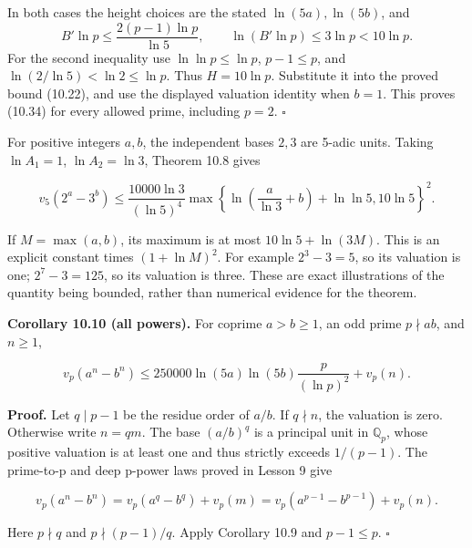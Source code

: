 \documentclass[
  11pt,
  a4paper,
]{article}
\begin{document}
In both cases the height choices are the stated \(\ln(5a),\ln(5b)\), and
\[
B'\ln p\le\frac{2(p-1)\ln p}{\ln5},
\qquad \ln(B'\ln p)\le3\ln p<10\ln p.
\] For the second inequality use \(\ln\ln p\le\ln p\), \(p-1\le p\), and
\(\ln(2/\ln5)<\ln2\le\ln p\). Thus \(H=10\ln p\). Substitute it into the
proved bound (10.22), and use the displayed valuation identity when
\(b=1\). This proves (10.34) for every allowed prime, including \(p=2\).
\(\square\)

For positive integers \(a,b\), the independent bases \(2,3\) are 5-adic
units. Taking \(\ln A_1=1\), \(\ln A_2=\ln3\), Theorem 10.8 gives

\[
v_5(2^a-3^b)
\le\frac{10000\ln3}{(\ln5)^4}
\max\!\left\{\ln\left(\frac a{\ln3}+b\right)+\ln\ln5,10\ln5\right\}^{2}.
\tag{10.35}
\]

If \(M=\max(a,b)\), its maximum is at most \(10\ln5+\ln(3M)\). This is
an explicit constant times \((1+\ln M)^2\). For example \(2^3-3=5\), so
its valuation is one; \(2^7-3=125\), so its valuation is three. These
are exact illustrations of the quantity being bounded, rather than
numerical evidence for the theorem.

\textbf{Corollary 10.10 (all powers).} For coprime \(a>b\ge1\), an odd
prime \(p\nmid ab\), and \(n\ge1\),

\[
v_p(a^n-b^n)
\le250000\ln(5a)\ln(5b)\frac p{(\ln p)^2}+v_p(n).
\tag{10.36}
\]

\textbf{Proof.} Let \(q\mid p-1\) be the residue order of \(a/b\). If
\(q\nmid n\), the valuation is zero. Otherwise write \(n=qm\). The base
\((a/b)^q\) is a principal unit in \(\mathbb Q_p\), whose positive
valuation is at least one and thus strictly exceeds \(1/(p-1)\). The
prime-to-p and deep p-power laws proved in Lesson 9 give

\[
v_p(a^n-b^n)=v_p(a^q-b^q)+v_p(m)
=v_p(a^{p-1}-b^{p-1})+v_p(n).
\]

Here \(p\nmid q\) and \(p\nmid(p-1)/q\). Apply Corollary 10.9 and
\(p-1\le p\). \(\square\)
\end{document}
